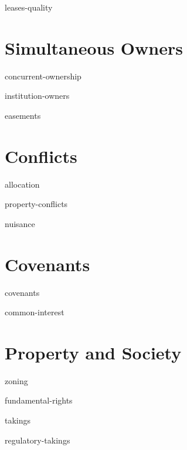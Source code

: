 \documentclass[12pt]{book}
\begin{document}
\module leases-quality




\edmaterialfalse

\makevolume

\tableofcontents

\mainmatter


\part{Simultaneous Owners}

\module concurrent-ownership

\module institution-owners

\module easements



\part{Conflicts}

\module allocation

\module property-conflicts

\module nuisance




\part{Covenants}

\module covenants

\module common-interest





\part{Property and Society}

\module zoning

\module fundamental-rights

\module takings

\module regulatory-takings
\end{document}

